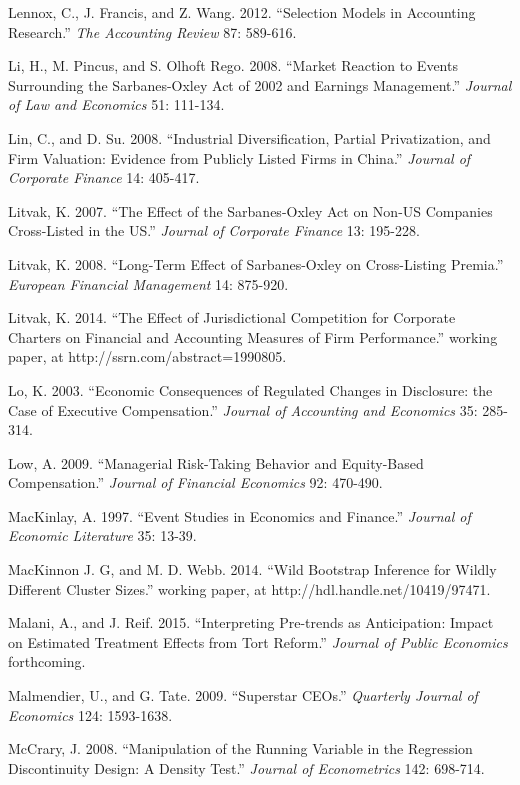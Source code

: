 \noindent Lennox, C., J. Francis, and Z. Wang. 2012. ``Selection Models in Accounting Research.'' \textit{The Accounting Review} 87: 589-616.

\noindent Li, H., M. Pincus, and S. Olhoft Rego. 2008. ``Market Reaction to Events Surrounding the Sarbanes-Oxley Act of 2002 and Earnings Management.''  \textit{Journal of Law and Economics} 51: 111-134.

\noindent Lin, C., and D. Su. 2008.  ``Industrial Diversification, Partial Privatization, and Firm Valuation:  Evidence from Publicly Listed Firms in China.''  \textit{Journal of Corporate Finance} 14:  405-417.

\noindent Litvak, K. 2007. ``The Effect of the Sarbanes-Oxley Act on Non-US Companies Cross-Listed in the US.'' \textit{Journal of Corporate Finance} 13: 195-228.

\noindent Litvak, K. 2008. ``Long-Term Effect of Sarbanes-Oxley on Cross-Listing Premia.'' \textit{European Financial Management} 14: 875-920.

\noindent Litvak, K. 2014. ``The Effect of Jurisdictional Competition for Corporate Charters on Financial and Accounting Measures of Firm Performance.'' working paper, at http://ssrn.com/abstract=1990805. 

\noindent Lo, K. 2003. ``Economic Consequences of Regulated Changes in Disclosure: the Case of Executive Compensation.''  \textit{Journal of Accounting and Economics} 35: 285-314.

\noindent Low, A. 2009. ``Managerial Risk-Taking Behavior and Equity-Based Compensation.'' \textit{Journal of Financial Economics} 92: 470-490.

\noindent MacKinlay, A. 1997. ``Event Studies in Economics and Finance.'' \textit{Journal of Economic Literature} 35: 13-39.

\noindent MacKinnon J. G, and M. D. Webb.  2014.  ``Wild Bootstrap Inference for Wildly Different Cluster Sizes.'' working paper, at http://hdl.handle.net/10419/97471.

\noindent Malani, A., and J. Reif.  2015.  ``Interpreting Pre-trends as Anticipation:  Impact on Estimated Treatment Effects from Tort Reform.''  \textit{Journal of Public Economics} forthcoming.

\noindent Malmendier, U., and G. Tate. 2009. ``Superstar CEOs.'' \textit{Quarterly Journal of Economics} 124: 1593-1638.

\noindent McCrary, J. 2008. ``Manipulation of the Running Variable in the Regression Discontinuity Design:  A Density Test.'' \textit{Journal of Econometrics} 142: 698-714.

